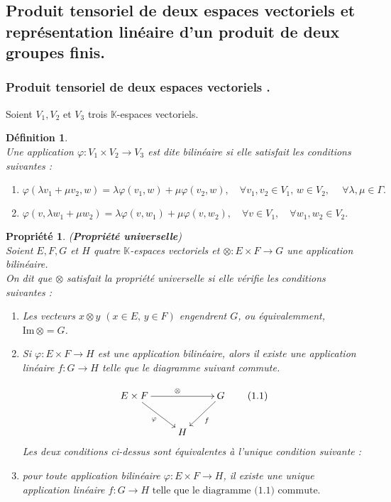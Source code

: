 \documentclass[a4paper, 14pt]{report}
\newtheorem{definition}{Définition}[section]
\newtheorem{propriety}{Propriété}[section]
\begin{document}
\begin{onehalfspace}
{\subsection{Produit tensoriel de deux espaces vectoriels et représentation linéaire d'un produit de deux groupes finis.}


\subsubsection{Produit tensoriel de deux espaces vectoriels .}

Soient \( V_1 , V_2 \) et \(V_3\) trois \(\mathbb{K}\)-espaces vectoriels.
\begin{definition} \cite{greub2012linear}\\
	Une application \(\varphi : V_1 \times V_2 \to V_3 \) est dite bilinéaire si elle satisfait les conditions suivantes :
	\begin{enumerate}[label=\roman*)]
		\item \(\varphi(\lambda v_1 + \mu v_2, w) = \lambda \varphi(v_1, w) + \mu \varphi(v_2, w), \quad \forall v_1, v_2 \in V_1, \, w \in V_2, \ \quad \forall \lambda, \mu \in \Gamma. \)
		
		\item \(\varphi(v, \lambda w_1 + \mu w_2) = \lambda \varphi(v, w_1) + \mu \varphi(v, w_2), \quad \forall v \in V_1, \quad \forall w_1, w_2 \in V_2.\)
	\end{enumerate}
\end{definition}

\begin{propriety}(\textbf{Propriété universelle}) \cite{greub2012linear} \label{pupt}\\
	Soient \( E,F ,G \) et \(H\) quatre \(\mathbb{K}\)-espaces vectoriels et \(\otimes : E \times F \to G \) une application bilinéaire. \\
	On dit que $\otimes$ satisfait la \textit{propriété universelle} si elle vérifie les conditions suivantes :
	\begin{enumerate} [label=\roman*)]
		\item Les vecteurs $x \otimes y$ $(x \in E, \, y \in F)$ engendrent $G$, ou équivalemment, $\mathrm{Im} \, \otimes = G$.
		\item Si \(\varphi : E \times F \to H \) est une application bilinéaire, alors il existe une application linéaire $f : G \to H$ telle que le diagramme suivant commute.
		
		\[
		\xymatrix{
			E \times F \ar[rr]^{\otimes} \ar[dr]_{\varphi} & & G \ar[dl]^{f} \\
			& H &
		}  \quad \quad \text{(1.1)}
		\] 
		Les deux conditions ci-dessus sont équivalentes à l'unique condition suivante :
		\item pour toute application bilinéaire  $\varphi : E \times F \to H$,  il existe une unique application linéaire \(f : G \to H \text{ telle que le diagramme (1.1) commute.}\)
	\end{enumerate}
\end{propriety}


}
\end{onehalfspace}
\end{document}

